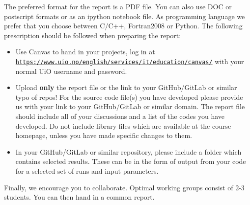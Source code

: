\documentclass[%
oneside,                 %
final,                   %
10pt]{article}
\begin{document}
The preferred format for the report is a PDF file. You can also use DOC or postscript formats or as an ipython notebook file.  As programming language we prefer that you choose between C/C++, Fortran2008 or Python. The following prescription should be followed when preparing the report:

\begin{itemize}
  \item Use Canvas to hand in your projects, log in  at  \href{{https://www.uio.no/english/services/it/education/canvas/}}{\nolinkurl{https://www.uio.no/english/services/it/education/canvas/}} with your normal UiO username and password.

  \item Upload \textbf{only} the report file or the link to your GitHub/GitLab or similar typo of  repos!  For the source code file(s) you have developed please provide us with your link to your GitHub/GitLab or similar  domain.  The report file should include all of your discussions and a list of the codes you have developed.  Do not include library files which are available at the course homepage, unless you have made specific changes to them.

  \item In your GitHub/GitLab or similar repository, please include a folder which contains selected results. These can be in the form of output from your code for a selected set of runs and input parameters.
\end{itemize}

\noindent
Finally, 
we encourage you to collaborate. Optimal working groups consist of 
2-3 students. You can then hand in a common report. 


\end{document}
